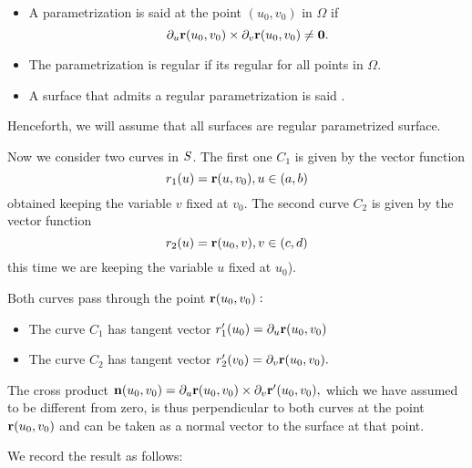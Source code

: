 \begin{df} \mbox{}
\begin{itemize}
 \item  A parametrization is said  at the point $(u_0,v_0)$ in $\Omega$ if
\[
\partial_u \mathbf{ r}(u_0,v_0)\times \partial_v \mathbf{ r}(u_0,v_0)\ne \mathbf{ 0}.
\]
\item The parametrization is regular if its regular for all points in $\Omega$.
\item A surface that admits a regular parametrization is said .
\end{itemize}
\end{df}

Henceforth, we will assume that all surfaces are regular parametrized surface.



Now we consider two curves in  $S$. The first one $C_1$ is given by the vector function
\[
r_1(u)=\mathbf{ r}(u,v_0),u\in (a,b)
\]
obtained  keeping the variable  $v$ fixed at $v_0$.   The second curve $C_2$ is given by the vector function
\[
r_2(u)=\mathbf{ r}(u_0,v),v\in (c,d)
\]
this time we are keeping the variable  $u$ fixed at $u_0$).

Both curves pass through the point  $\mathbf{ r}(u_0,v_0):$

\begin{itemize}
 \item The curve $C_{{1}}$ has tangent vector $r_1^{\prime }(u_0)=\partial_u \mathbf{ r}(u_0,v_0)$
\item The curve $C_{{2}}$ has tangent vector $r_2^{\prime }(v_0)=\partial_v \mathbf{ r}(u_0,v_0).$
\end{itemize}


The cross product $ \mathbf{ n}(u_0,v_0)=\partial_u \mathbf{ r}(u_0,v_0)\times \partial_v \mathbf{ r}^{\prime
}(u_0,v_0),$ which we have assumed to be different from zero, is thus
perpendicular to both curves at the point $\mathbf{ r}(u_0,v_0)$ and can be taken as
a normal vector  to the surface at that point.

We record the result as follows:




